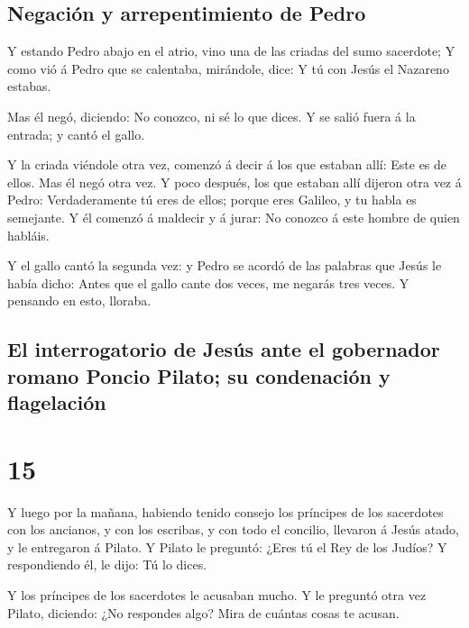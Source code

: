 \hypertarget{negaciuxf3n-y-arrepentimiento-de-pedro}{%
\subsection{Negación y arrepentimiento de
Pedro}\label{negaciuxf3n-y-arrepentimiento-de-pedro}}

 Y estando Pedro abajo en el atrio, vino una de las
criadas del sumo sacerdote;  Y como vió á Pedro que se
calentaba, mirándole, dice: Y tú con Jesús el Nazareno estabas.

 Mas él negó, diciendo: No conozco, ni sé lo que dices. Y
se salió fuera á la entrada; y cantó el gallo.

 Y la criada viéndole otra vez, comenzó á decir á los que
estaban allí: Este es de ellos.  Mas él negó otra vez. Y
poco después, los que estaban allí dijeron otra vez á Pedro:
Verdaderamente tú eres de ellos; porque eres Galileo, y tu habla es
semejante.  Y él comenzó á maldecir y á jurar: No conozco
á este hombre de quien habláis.

 Y el gallo cantó la segunda vez: y Pedro se acordó de
las palabras que Jesús le había dicho: Antes que el gallo cante dos
veces, me negarás tres veces. Y pensando en esto, lloraba.

\hypertarget{el-interrogatorio-de-jesuxfas-ante-el-gobernador-romano-poncio-pilato-su-condenaciuxf3n-y-flagelaciuxf3n}{%
\subsection{El interrogatorio de Jesús ante el gobernador romano Poncio
Pilato; su condenación y
flagelación}\label{el-interrogatorio-de-jesuxfas-ante-el-gobernador-romano-poncio-pilato-su-condenaciuxf3n-y-flagelaciuxf3n}}

\hypertarget{section-14}{%
\section{15}\label{section-14}}

 Y luego por la mañana, habiendo tenido consejo los
príncipes de los sacerdotes con los ancianos, y con los escribas, y con
todo el concilio, llevaron á Jesús atado, y le entregaron á Pilato.
 Y Pilato le preguntó: ¿Eres tú el Rey de los Judíos? Y
respondiendo él, le dijo: Tú lo dices.

 Y los príncipes de los sacerdotes le acusaban mucho.
 Y le preguntó otra vez Pilato, diciendo: ¿No respondes
algo? Mira de cuántas cosas te acusan.


